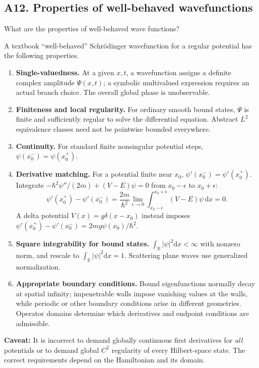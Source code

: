 \documentclass[11pt,a4paper]{article}
\newcommand{\dd}{\mathrm{d}}
\newcommand{\R}{\mathbb R}
\begin{document}
\subsection{A12. Properties of well-behaved wavefunctions}
\begin{questionbox}What are the properties of well-behaved wave functions?\end{questionbox}
A textbook ``well-behaved'' Schr\"odinger wavefunction for a regular potential has the following properties.
\begin{enumerate}[leftmargin=*,itemsep=3pt]
\item \textbf{Single-valuedness.} At a given $x,t$, a wavefunction assigns a definite complex amplitude $\Psi(x,t)$; a symbolic multivalued expression requires an actual branch choice. The overall global phase is unobservable.
\item \textbf{Finiteness and local regularity.} For ordinary smooth bound states, $\Psi$ is finite and sufficiently regular to solve the differential equation. Abstract $L^2$ equivalence classes need not be pointwise bounded everywhere.
\item \textbf{Continuity.} For standard finite nonsingular potential steps, $\psi(x_0^-)=\psi(x_0^+)$.
\item \textbf{Derivative matching.} For a potential finite near $x_0$, $\psi'(x_0^-)=\psi'(x_0^+)$. Integrate $-\hbar^2\psi''/(2m)+(V-E)\psi=0$ from $x_0-\epsilon$ to $x_0+\epsilon$:
\begin{equation}
\psi'(x_0^+)-\psi'(x_0^-)=\frac{2m}{\hbar^2}\lim_{\epsilon\to0}\int_{x_0-\epsilon}^{x_0+\epsilon}(V-E)\psi\,\dd x=0.
\end{equation}
A delta potential $V(x)=g\delta(x-x_0)$ instead imposes $\psi'(x_0^+)-\psi'(x_0^-)=2mg\psi(x_0)/\hbar^2$.
\item \textbf{Square integrability for bound states.} $\int_{\R}|\psi|^2\dd x<\infty$ with nonzero norm, and rescale to $\int_{\R}|\psi|^2\dd x=1$. Scattering plane waves use generalized normalization.
\item \textbf{Appropriate boundary conditions.} Bound eigenfunctions normally decay at spatial infinity; impenetrable walls impose vanishing values at the walls, while periodic or other boundary conditions arise in different geometries. Operator domains determine which derivatives and endpoint conditions are admissible.
\end{enumerate}
\textbf{Caveat:} It is incorrect to demand globally continuous first derivatives for \emph{all} potentials or to demand global $C^2$ regularity of every Hilbert-space state. The correct requirements depend on the Hamiltonian and its domain.
\end{document}
